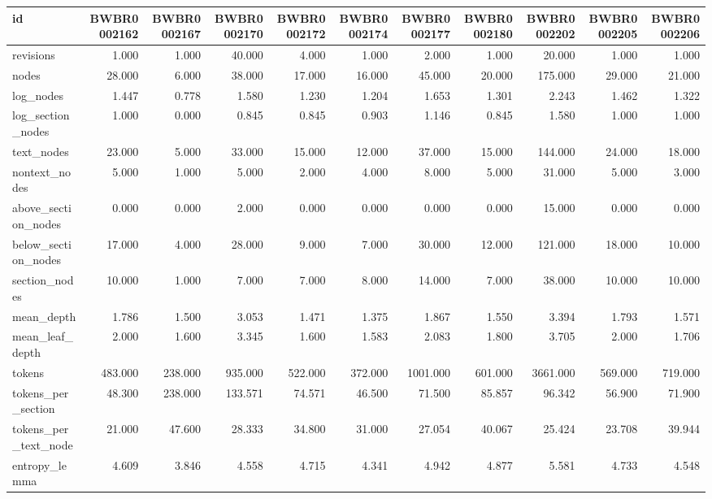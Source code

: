 \begin{tabular}{lrrrrrrrrrr}
\toprule
id & BWBR0002162 & BWBR0002167 & BWBR0002170 & BWBR0002172 & BWBR0002174 & BWBR0002177 & BWBR0002180 & BWBR0002202 & BWBR0002205 & BWBR0002206 \\
\midrule
revisions & 1.000 & 1.000 & 40.000 & 4.000 & 1.000 & 2.000 & 1.000 & 20.000 & 1.000 & 1.000 \\
\cline{1-11}
nodes & 28.000 & 6.000 & 38.000 & 17.000 & 16.000 & 45.000 & 20.000 & 175.000 & 29.000 & 21.000 \\
\cline{1-11}
log\_nodes & 1.447 & 0.778 & 1.580 & 1.230 & 1.204 & 1.653 & 1.301 & 2.243 & 1.462 & 1.322 \\
\cline{1-11}
log\_section\_nodes & 1.000 & 0.000 & 0.845 & 0.845 & 0.903 & 1.146 & 0.845 & 1.580 & 1.000 & 1.000 \\
\cline{1-11}
text\_nodes & 23.000 & 5.000 & 33.000 & 15.000 & 12.000 & 37.000 & 15.000 & 144.000 & 24.000 & 18.000 \\
\cline{1-11}
nontext\_nodes & 5.000 & 1.000 & 5.000 & 2.000 & 4.000 & 8.000 & 5.000 & 31.000 & 5.000 & 3.000 \\
\cline{1-11}
above\_section\_nodes & 0.000 & 0.000 & 2.000 & 0.000 & 0.000 & 0.000 & 0.000 & 15.000 & 0.000 & 0.000 \\
\cline{1-11}
below\_section\_nodes & 17.000 & 4.000 & 28.000 & 9.000 & 7.000 & 30.000 & 12.000 & 121.000 & 18.000 & 10.000 \\
\cline{1-11}
section\_nodes & 10.000 & 1.000 & 7.000 & 7.000 & 8.000 & 14.000 & 7.000 & 38.000 & 10.000 & 10.000 \\
\cline{1-11}
mean\_depth & 1.786 & 1.500 & 3.053 & 1.471 & 1.375 & 1.867 & 1.550 & 3.394 & 1.793 & 1.571 \\
\cline{1-11}
mean\_leaf\_depth & 2.000 & 1.600 & 3.345 & 1.600 & 1.583 & 2.083 & 1.800 & 3.705 & 2.000 & 1.706 \\
\cline{1-11}
tokens & 483.000 & 238.000 & 935.000 & 522.000 & 372.000 & 1001.000 & 601.000 & 3661.000 & 569.000 & 719.000 \\
\cline{1-11}
tokens\_per\_section & 48.300 & 238.000 & 133.571 & 74.571 & 46.500 & 71.500 & 85.857 & 96.342 & 56.900 & 71.900 \\
\cline{1-11}
tokens\_per\_text\_node & 21.000 & 47.600 & 28.333 & 34.800 & 31.000 & 27.054 & 40.067 & 25.424 & 23.708 & 39.944 \\
\cline{1-11}
entropy\_lemma & 4.609 & 3.846 & 4.558 & 4.715 & 4.341 & 4.942 & 4.877 & 5.581 & 4.733 & 4.548 \\

\end{tabular}
